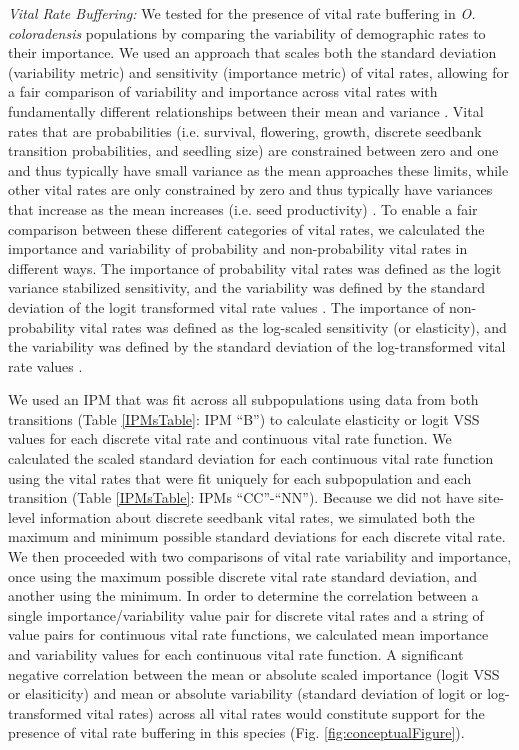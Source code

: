 \documentclass[12pt, letterpaper]{article}
\begin{document}
\textit{Vital Rate Buffering:} We tested for the presence of vital rate buffering in \textit{O. coloradensis} populations by comparing the variability of demographic rates to their importance. We used an approach that scales both the standard deviation (variability metric) and sensitivity (importance metric) of vital rates, allowing for a fair comparison of variability and importance across vital rates with fundamentally different relationships between their mean and variance \cite{McDonald2017DivergentEnvironments}. Vital rates that are probabilities (i.e. survival, flowering, growth, discrete seedbank transition probabilities, and seedling size) are constrained between zero and one and thus typically have small variance as the mean approaches these limits, while other vital rates are only constrained by zero and thus typically have variances that increase as the mean increases (i.e. seed productivity) \cite{Gaillard2003-ch}. To enable a fair comparison between these different categories of vital rates, we calculated the importance and variability of probability and non-probability vital rates in different ways. The importance of probability vital rates was defined as the logit variance stabilized sensitivity, and the variability was defined by the standard deviation of the logit transformed vital rate values \cite{McDonald2017DivergentEnvironments, William_A_Link_Paul_F_Doherty_Fr2002-cb}. The importance of non-probability vital rates was defined as the log-scaled sensitivity (or elasticity), and the variability was defined by the standard deviation of the log-transformed vital rate values \cite{McDonald2017DivergentEnvironments, Morris2002QuantitativeAnalysis}.

We used an IPM that was fit across all subpopulations using data from both transitions (Table \ref{IPMsTable}: IPM “B”) to calculate elasticity or logit VSS values for each discrete vital rate and continuous vital rate function. 
We calculated the scaled standard deviation for each continuous vital rate function using the vital rates that were fit uniquely for each subpopulation and each transition (Table \ref{IPMsTable}: IPMs “CC”-“NN”). Because we did not have site-level information about discrete seedbank vital rates, we simulated both the maximum and minimum possible standard deviations for each discrete vital rate. We then proceeded with two comparisons of vital rate variability and importance, once using the maximum possible discrete vital rate standard deviation, and another using the minimum. In order to determine the correlation between a single importance/variability value pair for discrete vital rates and a string of value pairs for continuous vital rate functions, we calculated mean importance and variability values for each continuous vital rate function. A significant negative correlation between the mean or absolute scaled importance (logit VSS or elasiticity) and mean or absolute variability (standard deviation of logit or log-transformed vital rates) across all vital rates would constitute support for the presence of vital rate buffering in this species
(Fig. \ref{fig:conceptualFigure}).  
\end{document}
